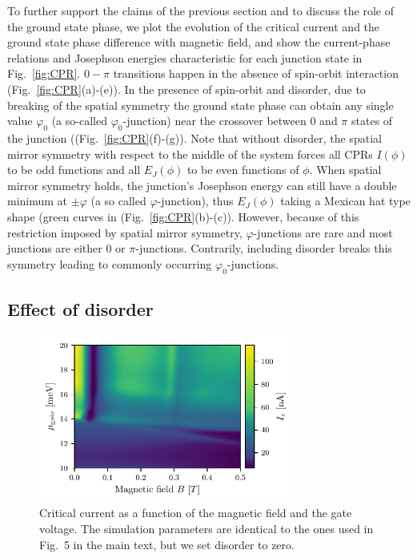 To further support the claims of the previous section and to discuss the role of the ground state phase, we plot the evolution of the critical current and the ground state phase difference with magnetic field, and show the current-phase relations and Josephson energies characteristic for each junction state in Fig.~\ref{fig:CPR}.
$0-\pi$ transitions happen in the absence of spin-orbit interaction (Fig.~\ref{fig:CPR}(a)-(e)).
In the presence of spin-orbit and disorder, due to breaking of the spatial symmetry the ground state phase can obtain any single value $\varphi_0$ (a so-called $\varphi_0$-junction) near the crossover between $0$ and $\pi$ states of the junction ((Fig.~\ref{fig:CPR}(f)-(g)).
Note that without disorder, the spatial mirror symmetry with respect to the middle of the system forces all CPRs $I(\phi)$ to be odd functions and all $E_J(\phi)$ to be even functions of $\phi$.
When spatial mirror symmetry holds, the junction's Josephson energy can still have a double minimum at $\pm\varphi$ (a so called $\varphi$-junction), thus $E_J(\phi)$ taking a Mexican hat type shape (green curves in (Fig.~\ref{fig:CPR}(b)-(c)).
However, because of this restriction imposed by spatial mirror symmetry, $\varphi$-junctions are rare and most junctions are either 0 or $\pi$-junctions.
Contrarily, including disorder breaks this symmetry leading to commonly occurring $\varphi_0$-junctions.

\subsection{Effect of disorder}

\begin{figure}[!h]
\centering
\includegraphics[width=0.75\textwidth]{chapter_supercurrent/figures/sup_fig9.pdf}
\caption{Critical current as a function of the magnetic field and the gate voltage. The simulation parameters are identical to the ones used in Fig.~5 in the main text, but we set disorder to zero.\label{fig:gate_dependence}}
\end{figure}

